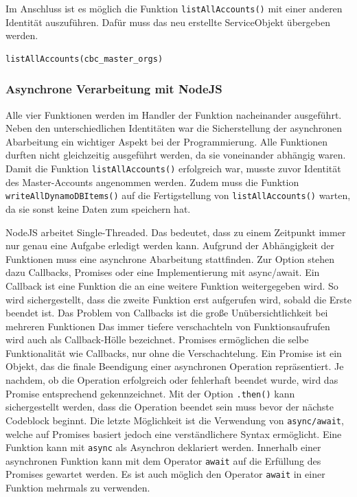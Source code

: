 Im Anschluss ist es möglich die Funktion \verb+listAllAccounts()+ mit einer anderen Identität auszuführen.
Dafür muss das neu erstellte ServiceObjekt übergeben werden.

\begin{lstlisting}[basicstyle=\ttfamily\small, breaklines=true , frame = single, backgroundcolor=\color{lightgray} ]
listAllAccounts(cbc_master_orgs)
\end{lstlisting}

\subsubsection{Asynchrone Verarbeitung mit NodeJS}

Alle vier Funktionen werden im Handler der Funktion nacheinander ausgeführt.
Neben den unterschiedlichen Identitäten war die Sicherstellung der asynchronen Abarbeitung ein wichtiger Aspekt bei der Programmierung.
Alle Funktionen durften nicht gleichzeitig ausgeführt werden, da sie voneinander abhängig waren.
Damit die Funktion \verb+listAllAccounts()+ erfolgreich war, musste zuvor Identität des Master-Accounts angenommen werden.
Zudem muss die Funktion \verb+writeAllDynamoDBItems()+ auf die Fertigstellung von \verb+listAllAccounts()+ warten, da sie sonst keine Daten zum speichern hat.

NodeJS arbeitet Single-Threaded.
Das bedeutet, dass zu einem Zeitpunkt immer nur genau eine Aufgabe erledigt werden kann.
Aufgrund der Abhängigkeit der Funktionen muss eine asynchrone Abarbeitung stattfinden.
Zur Option stehen dazu Callbacks, Promises oder eine Implementierung mit async/await.
Ein Callback ist eine Funktion die an eine weitere Funktion weitergegeben wird.
So wird sichergestellt, dass die zweite Funktion erst aufgerufen wird, sobald die Erste beendet ist.
Das Problem von Callbacks ist die große Unübersichtlichkeit bei mehreren Funktionen
Das immer tiefere verschachteln von Funktionsaufrufen wird auch als \glqq Callback-Hölle\grqq{} bezeichnet.
Promises ermöglichen die selbe Funktionalität wie Callbacks, nur ohne die Verschachtelung.
\glqq Ein Promise ist ein Objekt, das die finale Beendigung einer asynchronen Operation repräsentiert.
Je nachdem, ob die Operation erfolgreich oder fehlerhaft beendet wurde, wird das Promise entsprechend gekennzeichnet. \grqq{} \cite[]{Promises}
Mit der Option \verb+.then()+ kann sichergestellt werden, dass die Operation beendet sein muss bevor der nächste Codeblock beginnt.
Die letzte Möglichkeit ist die Verwendung von \verb+async/await+, welche auf Promises basiert jedoch eine verständlichere Syntax ermöglicht.
Eine Funktion kann mit \verb+async+ als Asynchron deklariert werden.
Innerhalb einer asynchronen Funktion kann mit dem Operator \verb+await+ auf die Erfüllung des Promises gewartet werden.
Es ist auch möglich den Operator \verb+await+ in einer Funktion mehrmals zu verwenden.

